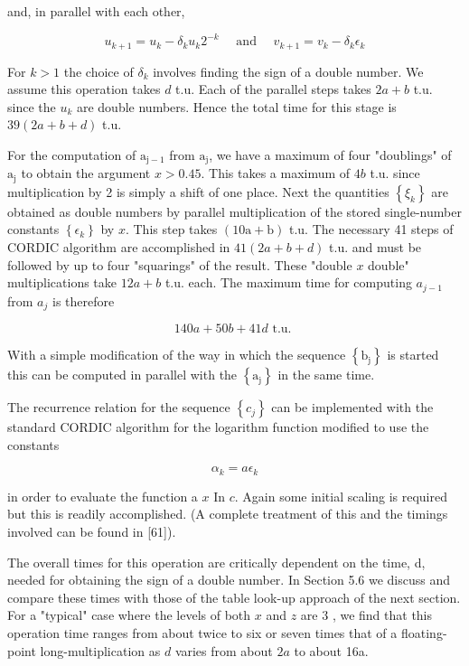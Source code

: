 \documentclass[10pt]{article}
\begin{document}
and, in parallel with each other,

$$
u_{k+1}=u_{k}-\delta_{k} u_{k} 2^{-k} \quad \text { and } \quad v_{k+1}=v_{k}-\delta_{k} \epsilon_{k}
$$

For $k>1$ the choice of $\delta_{k}$ involves finding the sign of a double number. We assume this operation takes $d$ t.u. Each of the parallel steps takes $2 a+b$ t.u. since the $u_{k}$ are double numbers. Hence the total time for this stage is $39(2 a+b+d)$ t.u.

For the computation of $\mathrm{a}_{\mathrm{j}-1}$ from $\mathrm{a}_{\mathrm{j}}$, we have a maximum of four "doublings" of $\mathrm{a}_{\mathrm{j}}$ to obtain the argument $x>0.45$. This takes a maximum of $4 b$ t.u. since multiplication by 2 is simply a shift of one place. Next the quantities $\left\{\xi_{k}\right\}$ are obtained as double numbers by parallel multiplication of the stored single-number constants $\left\{\epsilon_{k}\right\}$ by $x$. This step takes $(10 \mathrm{a}+\mathrm{b})$ t.u. The necessary 41 steps of CORDIC algorithm are accomplished in $41(2 a+b+d)$ t.u. and must be followed by up to four "squarings" of the result. These "double $x$ double" multiplications take $12 a+b$ t.u. each. The maximum time for computing $a_{j-1}$ from $a_{j}$ is therefore

$$
140 a+50 b+41 d \text { t.u. }
$$

With a simple modification of the way in which the sequence $\left\{\mathrm{b}_{\mathrm{j}}\right\}$ is started this can be computed in parallel with the $\left\{\mathrm{a}_{\mathrm{j}}\right\}$ in the same time.

The recurrence relation for the sequence $\left\{c_{j}\right\}$ can be implemented with the standard CORDIC algorithm for the logarithm function modified to use the constants

$$
\alpha_{k}=a \epsilon_{k}
$$

in order to evaluate the function a $x$ In $c$. Again some initial scaling is required but this is readily accomplished. (A complete treatment of this and the timings involved can be found in [61]).

The overall times for this operation are critically dependent on the time, d, needed for obtaining the sign of a double number. In Section 5.6 we discuss and compare these times with those of the table look-up approach of the next section. For a "typical" case where the levels of both $x$ and $z$ are 3 , we find that this operation time ranges from about twice to six or seven times that of a floating-point long-multiplication as $d$ varies from about $2 a$ to about 16a.
\end{document}

